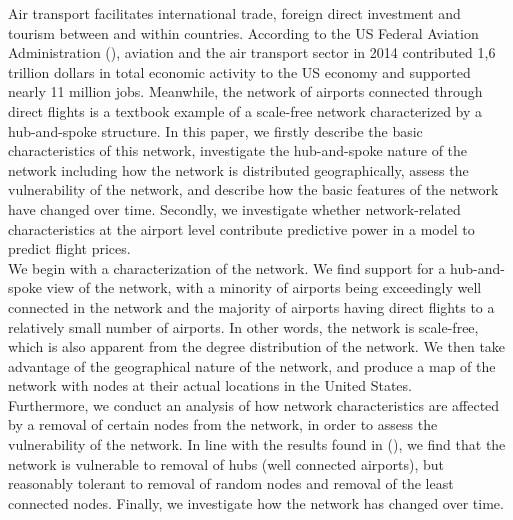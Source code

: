 \label{sec:intro}



Air transport facilitates international trade, foreign direct investment and tourism between and within countries. According to the US Federal Aviation Administration (\citet{FAA}), aviation and the air transport sector in 2014 contributed 1,6 trillion dollars in total economic activity to the US economy and supported nearly 11 million jobs. Meanwhile, the network of airports connected through direct flights is a textbook example of a scale-free network characterized by a hub-and-spoke structure. In this paper, we firstly describe the basic characteristics of this network, investigate the hub-and-spoke nature of the network including how the network is distributed geographically, assess the vulnerability of the network, and describe how the basic features of the network have changed over time. Secondly, we investigate whether network-related characteristics at the airport level contribute predictive power in a model to predict flight prices. 
\medskip \\
We begin with a characterization of the network. We find support for a hub-and-spoke view of the network, with a minority of airports being exceedingly well connected in the network and the majority of airports having direct flights to a relatively small number of airports. In other words, the network is scale-free, which is also apparent from the degree distribution of the network. We then take advantage of the geographical nature of the network, and produce a map of the network with nodes at their actual locations in the United States. \\ Furthermore, we conduct an analysis of how network characteristics are affected by a removal of certain nodes from the network, in order to assess the vulnerability of the network. In line with the results found in (\cite{chi2004structural}), we find that the network is vulnerable to removal of hubs (well connected airports), but reasonably tolerant to removal of random nodes and removal of the least connected nodes. Finally, we investigate how the network has changed over time. 
